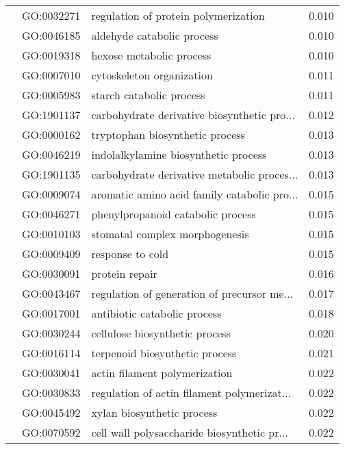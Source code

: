 \begin{longtable}{lllr}
   & GO:0032271 &         regulation of protein polymerization &         0.010 \\
   & GO:0046185 &                   aldehyde catabolic process &         0.010 \\
   & GO:0019318 &                     hexose metabolic process &         0.010 \\
   & GO:0007010 &                    cytoskeleton organization &         0.011 \\
   & GO:0005983 &                     starch catabolic process &         0.011 \\
   & GO:1901137 &  carbohydrate derivative biosynthetic pro... &         0.012 \\
   & GO:0000162 &              tryptophan biosynthetic process &         0.013 \\
   & GO:0046219 &         indolalkylamine biosynthetic process &         0.013 \\
   & GO:1901135 &  carbohydrate derivative metabolic proces... &         0.013 \\
   & GO:0009074 &  aromatic amino acid family catabolic pro... &         0.015 \\
   & GO:0046271 &            phenylpropanoid catabolic process &         0.015 \\
   & GO:0010103 &               stomatal complex morphogenesis &         0.015 \\
   & GO:0009409 &                             response to cold &         0.015 \\
   & GO:0030091 &                               protein repair &         0.016 \\
   & GO:0043467 &  regulation of generation of precursor me... &         0.017 \\
   & GO:0017001 &                 antibiotic catabolic process &         0.018 \\
   & GO:0030244 &               cellulose biosynthetic process &         0.020 \\
   & GO:0016114 &               terpenoid biosynthetic process &         0.021 \\
   & GO:0030041 &                actin filament polymerization &         0.022 \\
   & GO:0030833 &  regulation of actin filament polymerizat... &         0.022 \\
   & GO:0045492 &                   xylan biosynthetic process &         0.022 \\
   & GO:0070592 &  cell wall polysaccharide biosynthetic pr... &         0.022 \\

\end{longtable}

